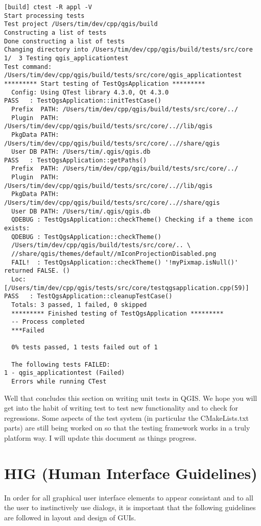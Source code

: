 \begin{verbatim}
[build] ctest -R appl -V
Start processing tests
Test project /Users/tim/dev/cpp/qgis/build
Constructing a list of tests
Done constructing a list of tests
Changing directory into /Users/tim/dev/cpp/qgis/build/tests/src/core
1/  3 Testing qgis_applicationtest          
Test command: /Users/tim/dev/cpp/qgis/build/tests/src/core/qgis_applicationtest
********* Start testing of TestQgsApplication *********
  Config: Using QTest library 4.3.0, Qt 4.3.0
PASS   : TestQgsApplication::initTestCase()
  Prefix  PATH: /Users/tim/dev/cpp/qgis/build/tests/src/core/../
  Plugin  PATH: /Users/tim/dev/cpp/qgis/build/tests/src/core/..//lib/qgis
  PkgData PATH: /Users/tim/dev/cpp/qgis/build/tests/src/core/..//share/qgis
  User DB PATH: /Users/tim/.qgis/qgis.db
PASS   : TestQgsApplication::getPaths()
  Prefix  PATH: /Users/tim/dev/cpp/qgis/build/tests/src/core/../
  Plugin  PATH: /Users/tim/dev/cpp/qgis/build/tests/src/core/..//lib/qgis
  PkgData PATH: /Users/tim/dev/cpp/qgis/build/tests/src/core/..//share/qgis
  User DB PATH: /Users/tim/.qgis/qgis.db
  QDEBUG : TestQgsApplication::checkTheme() Checking if a theme icon exists:
  QDEBUG : TestQgsApplication::checkTheme() 
  /Users/tim/dev/cpp/qgis/build/tests/src/core/.. \
  //share/qgis/themes/default//mIconProjectionDisabled.png
  FAIL!  : TestQgsApplication::checkTheme() '!myPixmap.isNull()' returned FALSE. ()
  Loc: [/Users/tim/dev/cpp/qgis/tests/src/core/testqgsapplication.cpp(59)]
PASS   : TestQgsApplication::cleanupTestCase()
  Totals: 3 passed, 1 failed, 0 skipped
  ********* Finished testing of TestQgsApplication *********
  -- Process completed
  ***Failed

  0% tests passed, 1 tests failed out of 1

  The following tests FAILED:
1 - qgis_applicationtest (Failed)
  Errors while running CTest

\end{verbatim}

Well that concludes this section on writing unit tests in QGIS. We hope you 
will get into the habit of writing test to test new functionality and to 
check for regressions. Some aspects of the test system (in particular the 
CMakeLists.txt parts) are still being worked on so that the testing framework 
works in a truly platform way. I will update this document as things progress.


\section{HIG (Human Interface Guidelines)}
In order for all graphical user interface elements to appear consistant and 
to all the user to instinctively use dialogs, it is important that the following 
guidelines are followed in layout and design of GUIs.

